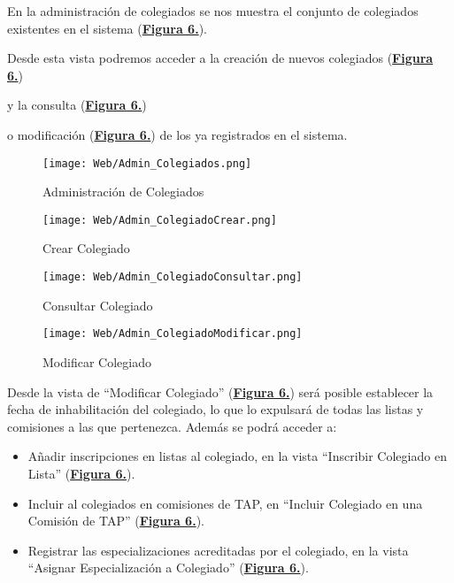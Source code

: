 \addtocounter{figura_manual}{1} En la administración de colegiados se nos muestra el conjunto de colegiados existentes en el sistema (\textbf{\hyperref[fig:Web_Admin_Colegiados]{Figura 6.}}).\addtocounter{figura_manual}{1}  Desde esta vista podremos acceder a la creación de nuevos colegiados (\textbf{\hyperref[fig:Web_Admin_ColegiadoCrear]{Figura 6.}}) \addtocounter{figura_manual}{1} y la consulta (\textbf{\hyperref[fig:Web_Admin_ColegiadoConsultar]{Figura 6.}})\addtocounter{figura_manual}{1}  o modificación (\textbf{\hyperref[fig:Web_Admin_ColegiadoModificar]{Figura 6.}}) de los ya registrados en el sistema.
\begin{figure}[!htbp]
  \centering
  \texttt{[image: Web/Admin\_Colegiados.png]}
  \caption{Administración de Colegiados}
  \label{fig:Web_Admin_Colegiados}
\end{figure}
\FloatBarrier

\begin{figure}[!htbp]
  \centering
  \texttt{[image: Web/Admin\_ColegiadoCrear.png]}
  \caption{Crear Colegiado}
  \label{fig:Web_Admin_ColegiadoCrear}
\end{figure}
\FloatBarrier

\begin{figure}[!htbp]
  \centering
  \texttt{[image: Web/Admin\_ColegiadoConsultar.png]}
  \caption{Consultar Colegiado}
  \label{fig:Web_Admin_ColegiadoConsultar}
\end{figure}
\FloatBarrier

\begin{figure}[!htbp]
  \centering
  \texttt{[image: Web/Admin\_ColegiadoModificar.png]}
  \caption{Modificar Colegiado}
  \label{fig:Web_Admin_ColegiadoModificar}
\end{figure}
\FloatBarrier

Desde la vista de ``Modificar Colegiado'' (\textbf{\hyperref[fig:Web_Admin_ColegiadoModificar]{Figura 6.}}) será posible establecer la fecha de inhabilitación del colegiado, lo que lo expulsará de todas las listas y comisiones a las que pertenezca. Además se podrá acceder a:
\begin{itemize}
  \item \addtocounter{figura_manual}{1} Añadir inscripciones en listas al colegiado, en la vista ``Inscribir Colegiado en Lista'' (\textbf{\hyperref[fig:Web_Admin_ColegiadoInscribirLista]{Figura 6.}}).
  \item \addtocounter{figura_manual}{1} Incluir al colegiados en comisiones de TAP, en ``Incluir Colegiado en una Comisión de TAP'' (\textbf{\hyperref[fig:Web_Admin_ColegiadoIncluirComision]{Figura 6.}}).
  \item \addtocounter{figura_manual}{1} Registrar las especializaciones acreditadas por el colegiado, en la vista ``Asignar Especialización a Colegiado'' (\textbf{\hyperref[fig:Web_Admin_ColegiadoAsignarEspecializacion]{Figura 6.}}).
\end{itemize}

